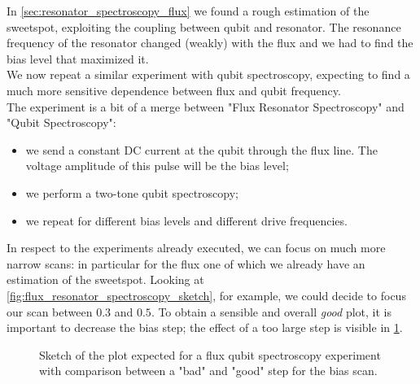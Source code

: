 
In \cref{sec:resonator_spectroscopy_flux} we found a rough estimation of the sweetspot, exploiting the coupling between qubit and resonator.
The resonance frequency of the resonator changed (weakly) with the flux and we had to find the bias level that maximized it.\\
We now repeat a similar experiment with qubit spectroscopy, expecting to find a much more sensitive dependence between flux and qubit frequency.\\
The experiment is a bit of a merge between "Flux Resonator Spectroscopy" and "Qubit Spectroscopy":
\begin{itemize}
    \item we send a constant DC current at the qubit through the flux line. The voltage amplitude of this pulse will be the bias level;
    \item we perform a two-tone qubit spectroscopy;
    \item we repeat for different bias levels and different drive frequencies.
\end{itemize}
In respect to the experiments already executed, we can focus on much more narrow scans: in particular for the flux one of which we already have an estimation of the sweetspot.
Looking at \cref{fig:flux_resonator_spectroscopy_sketch}, for example, we could decide to focus our scan between $0.3$ and $0.5$. 
To obtain a sensible and overall \textit{good} plot, it is important to decrease the bias step; the effect of a too large step is visible in \cref{fig:qubit_spectroscopy_flux_sketch}.

\begin{figure}[ht]
    \centering
    \qquad
    \caption{Sketch of the plot expected for a flux qubit spectroscopy experiment with comparison between a "bad" and "good" step for the bias scan.}%
    \label{fig:qubit_spectroscopy_flux_sketch}%
\end{figure}

